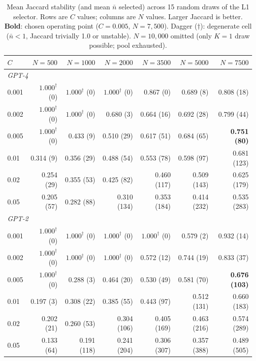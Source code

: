 \documentclass[11pt]{article}
\begin{document}
\begin{table}[!htbp]
\centering
\small
\caption{Mean Jaccard stability (and mean $\bar{n}$ selected) across 15 random draws of the L1 selector. Rows are $C$ values; columns are $N$ values. Larger Jaccard is better. \textbf{Bold}: chosen operating point ($C=0.005$, $N=7{,}500$). Dagger ($\dagger$): degenerate cell ($\bar{n}<1$, Jaccard trivially 1.0 or unstable). $N=10{,}000$ omitted (only $K=1$ draw possible; pool exhausted).}
\label{tab:stability-grid}
\begin{tabular}{lrrrrrr}
\toprule
$C$ & $N=500$ & $N=1000$ & $N=2000$ & $N=3500$ & $N=5000$ & $N=7500$ \\
\midrule
\multicolumn{7}{l}{\textit{GPT-4}} \\
0.001 & $1.000^\dagger$ (0)  & $1.000^\dagger$ (0)  & $1.000^\dagger$ (0)  & 0.867 (0)   & 0.689 (8)   & 0.808 (18) \\
0.002 & $1.000^\dagger$ (0)  & $1.000^\dagger$ (0)  & 0.680 (3)   & 0.664 (16)  & 0.692 (28)  & 0.799 (44) \\
0.005 & $1.000^\dagger$ (0)  & 0.433 (9)   & 0.510 (29)  & 0.617 (51)  & 0.684 (65)  & \textbf{0.751 (80)} \\
0.01  & 0.314 (9)   & 0.356 (29)  & 0.488 (54)  & 0.553 (78)  & 0.598 (97)  & 0.681 (123) \\
0.02  & 0.254 (29)  & 0.355 (53)  & 0.425 (82)  & 0.460 (117) & 0.509 (143) & 0.625 (179) \\
0.05  & 0.205 (57)  & 0.282 (88)  & 0.310 (134) & 0.353 (184) & 0.414 (232) & 0.535 (283) \\
\midrule
\multicolumn{7}{l}{\textit{GPT-2}} \\
0.001 & $1.000^\dagger$ (0)  & $1.000^\dagger$ (0)  & $1.000^\dagger$ (0)  & $1.000^\dagger$ (0)  & 0.579 (2)   & 0.932 (14) \\
0.002 & $1.000^\dagger$ (0)  & $1.000^\dagger$ (0)  & $1.000^\dagger$ (0)  & 0.572 (12)  & 0.744 (19)  & 0.833 (37) \\
0.005 & $1.000^\dagger$ (0)  & 0.288 (3)   & 0.464 (20)  & 0.530 (49)  & 0.581 (70)  & \textbf{0.676 (103)} \\
0.01  & 0.197 (3)   & 0.308 (22)  & 0.385 (55)  & 0.443 (97)  & 0.512 (131) & 0.660 (183) \\
0.02  & 0.202 (21)  & 0.260 (53)  & 0.304 (106) & 0.405 (169) & 0.463 (216) & 0.574 (289) \\
0.05  & 0.133 (64)  & 0.191 (118) & 0.241 (204) & 0.306 (307) & 0.357 (388) & 0.489 (505) \\
\midrule

\end{tabular}
\end{table}
\end{document}
